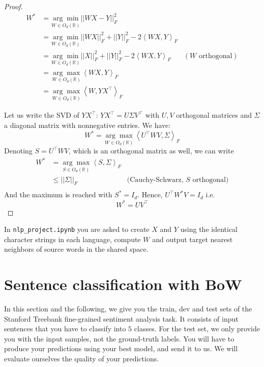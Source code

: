 \documentclass{article}
\newcommand{\br}[1]{\left( #1 \right)}
\newcommand{\inp}[1]{\left\langle #1 \right\rangle}
\newcommand{\norm}[1]{\left|\left| #1 \right|\right|}
\newcommand{\R}{\mathbb{R}}
\newenvironment{solution}[1]{\begin{proof}
#1}{
\end{proof}}
\begin{document}
\begin{solution}
\begin{equation*}
    \begin{aligned}
    W^* &= \underset{W \in O_d \br{\R}}{\arg\min} \norm{WX - Y}_F^2 \\
    &= \underset{W \in O_d \br{\R}}{\arg\min} \norm{WX}_F^2 + \norm{Y}_F^2 - 2 \inp{WX, Y}_F \\
    &= \underset{W \in O_d \br{\R}}{\arg\min} \norm{X}_F^2 + \norm{Y}_F^2 - 2 \inp{WX, Y}_F &(W \text{ orthogonal}) \\
    &= \underset{W \in O_d \br{\R}}{\arg\max} \inp{WX, Y}_F \\
    &= \underset{W \in O_d \br{\R}}{\arg\max} \inp{W, YX^\top}_F
    \end{aligned}
\end{equation*}

Let us write the SVD of $YX^\top$: $YX^\top = U \Sigma V^\top$ with $U, V$ orthogonal matrices and $\Sigma$ a diagonal matrix with nonnegative entries. We have:
\begin{equation*}
    W^* = \underset{W \in O_d \br{\R}}{\arg\max} \inp{U^\top W V, \Sigma}_F
\end{equation*}
Denoting $S = U^\top W V$, which is an orthogonal matrix as well, we can write
\begin{equation*}
    \begin{aligned}
    W^* &= \underset{S \in O_d \br{\R}}{\arg\max} \inp{S, \Sigma}_F \\
    &\leq \norm{\Sigma}_F & \text{(Cauchy-Schwarz, $S$ orthogonal)} \\
    \end{aligned}
\end{equation*}
And the maximum is reached with $S^* = I_d$. Hence, $U^\top W^* V = I_d$ i.e.
\begin{equation*}
    \boxed{W^* = U V^\top}
\end{equation*}
\end{solution}

In \texttt{nlp\_project.ipynb} you are asked to create $X$ and $Y$ using the identical character strings in each language, compute $W$ and output target nearest neighbors of source words in the shared space.

\section{Sentence classification with BoW}

In this section and the following, we give you the train, dev and test sets of the Stanford Treebank fine-grained sentiment analysis task. It consists of input sentences that you have to classify into $5$ classes. For the test set, we only provide you with the input samples, not the ground-truth labels. You will have to produce your predictions using your best model, and send it to us. We will evaluate ourselves the quality of your predictions. \\
\end{document}
